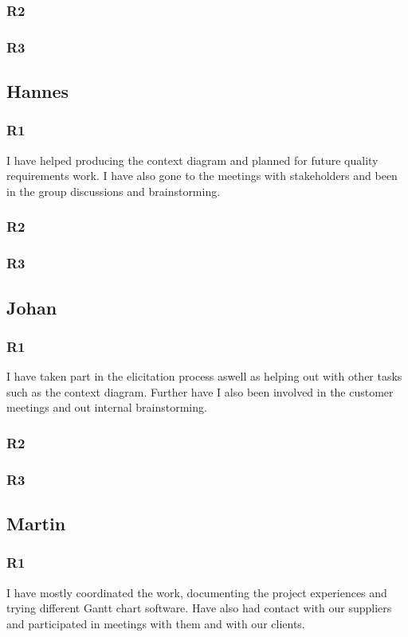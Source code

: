 \documentclass[a4paper]{article}
\begin{document}
    \subsubsection{R2}
    \subsubsection{R3}
  	
  \subsection{Hannes}
    \subsubsection{R1}
    I have helped producing the context diagram and planned for future quality requirements work. I have also gone to the meetings with stakeholders and been in the group discussions and brainstorming.
    \subsubsection{R2}
    \subsubsection{R3}
  
  \subsection{Johan}
    \subsubsection{R1}
    I have taken part in the elicitation process aswell as helping out with other tasks such as the context diagram. Further have I also been involved in the customer meetings and out internal brainstorming.
    \subsubsection{R2}
    \subsubsection{R3}
  
  \subsection{Martin}
    \subsubsection{R1}
    I have mostly coordinated the work, documenting the project experiences and trying different Gantt chart software. Have also had contact with our suppliers and participated in meetings with them and with our clients.
\end{document}
